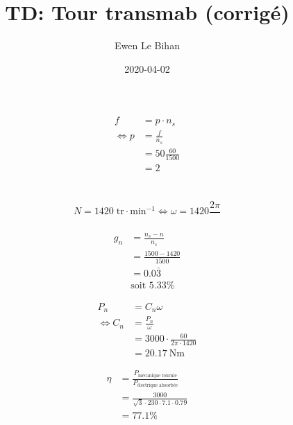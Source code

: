 \documentclass{article}
\title{TD: Tour transmab (corrigé)}
\author{Ewen Le Bihan}
\date{2020-04-02}
\newcommand{\rpm}{\text{tr}\cdot\text{min}^{-1}}
\begin{document}
\maketitle

\section{}

\begin{equation*}
  \begin{split}
    f &= p\cdot n_s \\
    \iff p &= \frac{f}{n_s} \\
    &= 50\frac{60}{1500} \\
    &= 2
  \end{split}
\end{equation*}

\section{}

$$N = 1420\;\rpm \iff \omega = 1420\frac{2\pi}{}$$

\begin{equation*}
  \begin{split}
    g_n &= \frac{n_s - n}{n_s} \\
    &= \frac{1500 - 1420}{1500} \\
    &= 0.0\bar 3\\
    &\text{soit }  5.33\%
  \end{split}
\end{equation*}

\begin{equation*}
  \begin{split}
    P_n &= C_n \omega \\
    \iff C_n &= \frac{P_n}{\omega} \\
    &= 3000 \cdot \frac{60}{2\pi\cdot1420} \\
    &= \SI{20.17}{\newton\meter}
  \end{split}
\end{equation*}

\begin{equation*}
  \begin{split}
    \eta &= \frac{P_\text{mécanique fournie}}{P_\text{électrique absorbée}}\\
    &= \frac{3000}{\sqrt{3}\cdot230\cdot7.1\cdot0.79} \\
    &= 77.1\%
  \end{split}
\end{equation*}
\end{document}
